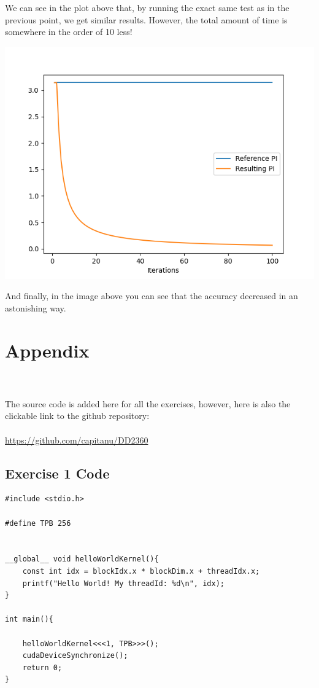 \documentclass[english]{exam}
\begin{document}
\begin{enumerate}
\begin{center}
  \end{center}
  \noindent We can see in the plot above that, by running the exact same test as in the previous point, we get similar results. However, the total amount of time is somewhere in the order of 10 less!\\
  \begin{center}
    \includegraphics[scale=0.65]{plot5.png}
  \end{center}
  \noindent And finally, in the image above you can see that the accuracy decreased in an astonishing way.

\end{enumerate}

\clearpage 
\chapter{Appendix}

\ \\
\ \\
The source code is added here for all the exercises, however, here is also the clickable link to the github repository:\\\\
\url{https://github.com/capitanu/DD2360}
\\
\section*{Exercise 1 Code}


\begin{lstlisting}[style=CStyle]
#include <stdio.h>

#define TPB 256


__global__ void helloWorldKernel(){
	const int idx = blockIdx.x * blockDim.x + threadIdx.x;
	printf("Hello World! My threadId: %d\n", idx);
}

int main(){

	helloWorldKernel<<<1, TPB>>>();
	cudaDeviceSynchronize();
	return 0;
}

\end{lstlisting}
\end{document}
